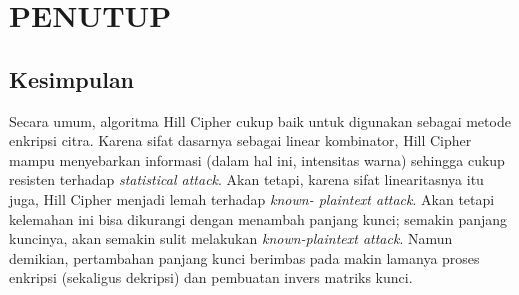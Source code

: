 \chapter{PENUTUP}

%
\vspace{12pt}

\section{Kesimpulan}
Secara umum, algoritma Hill Cipher cukup baik untuk digunakan sebagai metode enkripsi citra.
Karena sifat dasarnya sebagai linear kombinator, Hill Cipher mampu menyebarkan informasi
(dalam hal ini, intensitas warna) sehingga cukup resisten terhadap \emph{statistical attack}.
Akan tetapi, karena sifat linearitasnya itu juga, Hill Cipher menjadi lemah terhadap \emph{known-
plaintext attack}. Akan tetapi kelemahan ini bisa dikurangi dengan menambah panjang kunci; semakin 
panjang kuncinya, akan semakin sulit melakukan \emph{known-plaintext attack}. Namun demikian, pertambahan
panjang kunci berimbas pada makin lamanya proses enkripsi (sekaligus dekripsi) dan pembuatan invers 
matriks kunci.

